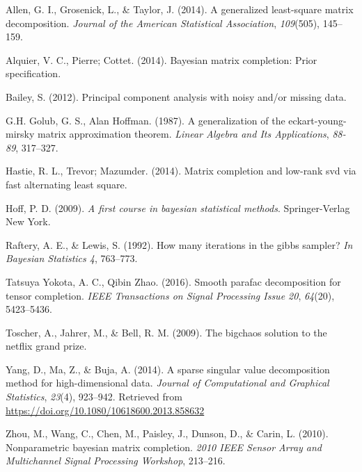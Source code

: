 \documentclass[12pt,twoside]{dukestatscithesis}
\theoremstyle{definition}
\theoremstyle{definition}
\theoremstyle{definition}
\theoremstyle{remark}
\begin{document}

\noindent

\setlength{\parindent}{-0.20in} \setlength{\leftskip}{0.20in}
\setlength{\parskip}{8pt}

\hypertarget{refs}{}
\hypertarget{ref-GLSmatrix2013}{}
Allen, G. I., Grosenick, L., \& Taylor, J. (2014). A generalized
least-square matrix decomposition. \emph{Journal of the American
Statistical Association}, \emph{109}(505), 145--159.

\hypertarget{ref-prior2014}{}
Alquier, V. C., Pierre; Cottet. (2014). Bayesian matrix completion:
Prior specification.

\hypertarget{ref-pca2012}{}
Bailey, S. (2012). Principal component analysis with noisy and/or
missing data.

\hypertarget{ref-EYM1987}{}
G.H. Golub, G. S., Alan Hoffman. (1987). A generalization of the
eckart-young-mirsky matrix approximation theorem. \emph{Linear Algebra
and Its Applications}, \emph{88-89}, 317--327.

\hypertarget{ref-fastALS2014}{}
Hastie, R. L., Trevor; Mazumder. (2014). Matrix completion and low-rank
svd via fast alternating least square.

\hypertarget{ref-hoff2009}{}
Hoff, P. D. (2009). \emph{A first course in bayesian statistical
methods}. Springer-Verlag New York.

\hypertarget{ref-iterations1992}{}
Raftery, A. E., \& Lewis, S. (1992). How many iterations in the gibbs
sampler? \emph{In Bayesian Statistics 4}, 763--773.

\hypertarget{ref-smoothParafac2016}{}
Tatsuya Yokota, A. C., Qibin Zhao. (2016). Smooth parafac decomposition
for tensor completion. \emph{IEEE Transactions on Signal Processing
Issue 20}, \emph{64}(20), 5423--5436.

\hypertarget{ref-netflix2009}{}
Toscher, A., Jahrer, M., \& Bell, R. M. (2009). The bigchaos solution to
the netflix grand prize.

\hypertarget{ref-sparse2014}{}
Yang, D., Ma, Z., \& Buja, A. (2014). A sparse singular value
decomposition method for high-dimensional data. \emph{Journal of
Computational and Graphical Statistics}, \emph{23}(4), 923--942.
Retrieved from \url{https://doi.org/10.1080/10618600.2013.858632}

\hypertarget{ref-gibbs2010}{}
Zhou, M., Wang, C., Chen, M., Paisley, J., Dunson, D., \& Carin, L.
(2010). Nonparametric bayesian matrix completion. \emph{2010 IEEE Sensor
Array and Multichannel Signal Processing Workshop}, 213--216.


\end{document}
